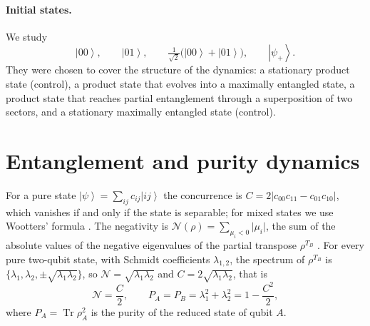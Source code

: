 \documentclass[10.5pt,a4paper]{article}
\newcommand{\ket}[1]{\left|#1\right\rangle}
\newcommand{\Tr}{\operatorname{Tr}}
\newcommand{\Neg}{\mathcal N}
\begin{document}
\paragraph{Initial states.}
We study
\begin{equation}
  \ket{00},\qquad \ket{01},\qquad \tfrac{1}{\sqrt2}\bigl(\ket{00}+\ket{01}\bigr),\qquad \ket{\psi_+}.
\end{equation}
They were chosen to cover the structure of the dynamics: a stationary product state (control), a product state that evolves into a maximally entangled state, a product state that reaches partial entanglement through a superposition of two sectors, and a stationary maximally entangled state (control).

\section{Entanglement and purity dynamics}\label{sec:ent}

For a pure state $\ket\psi=\sum_{ij}c_{ij}\ket{ij}$ the concurrence is $C=2\lvert c_{00}c_{11}-c_{01}c_{10}\rvert$, which vanishes if and only if the state is separable; for mixed states we use Wootters' formula \cite{Wootters1998}. The negativity is $\Neg(\rho)=\sum_{\mu_i<0}\lvert\mu_i\rvert$, the sum of the absolute values of the negative eigenvalues of the partial transpose $\rho^{T_B}$ \cite{VidalWerner2002}. For every pure two-qubit state, with Schmidt coefficients $\lambda_{1,2}$, the spectrum of $\rho^{T_B}$ is $\{\lambda_1,\lambda_2,\pm\sqrt{\lambda_1\lambda_2}\}$, so $\Neg=\sqrt{\lambda_1\lambda_2}$ and $C=2\sqrt{\lambda_1\lambda_2}$, that is
\begin{equation}
  \Neg=\frac C2,\qquad P_A=P_B=\lambda_1^2+\lambda_2^2=1-\frac{C^2}{2},
  \label{eq:NCP}
\end{equation}
where $P_{A}=\Tr\rho_A^2$ is the purity of the reduced state of qubit $A$.
\end{document}
